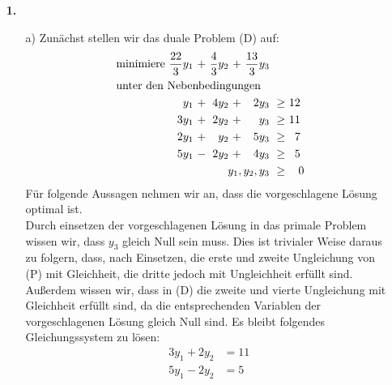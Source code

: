 \documentclass [a4paper,11pt]{article}
\author{\authorinfotitle}
\title{\titleinfo}
\date{\today}
\begin{document}
\maketitle
    \begin{enumerate}
        \item[\textbf{1.}]
            \begin{enumerate}
                \item[a)]
                    Zunächst stellen wir das duale Problem (D) auf:
                    \begin{align*}
                    \begin{alignedat}{6}
                    & \text{minimiere } & \frac{22}{3}y_1 &\ + &\ \frac{4}{3}y_2 &\ + &\ \frac{13}{3}y_3 & & \\
                    & \rlap{unter den Nebenbedingungen} & & & & & & & \\
                    &&  y_1 &\ + &\ 4y_2 &\ + &\ 2y_3 &\ \geq &\ 12\ \\
                    && 3y_1 &\ + &\ 2y_2 &\ + &\  y_3 &\ \geq &\ 11\ \\
                    && 2y_1 &\ + &\  y_2 &\ + &\ 5y_3 &\ \geq &\  7\ \\
                    && 5y_1 &\ - &\ 2y_2 &\ + &\ 4y_3 &\ \geq &\  5\ \\
                    && & & & & \llap{$y_1,y_2,y_3$} &\ \geq &\ 0
                    \end{alignedat}
                    \end{align*}
                    Für folgende Aussagen nehmen wir an, dass die vorgeschlagene Lösung optimal ist.\\
                    Durch einsetzen der vorgeschlagenen Lösung in das primale Problem wissen wir, dass $y_3$ gleich Null sein muss. Dies ist trivialer Weise
                    daraus zu folgern, dass, nach Einsetzen, die erste und zweite Ungleichung von (P) mit Gleichheit, die dritte jedoch mit Ungleichheit erfüllt
                    sind. Außerdem wissen wir, dass in (D) die zweite und vierte Ungleichung mit Gleichheit erfüllt sind, da die entsprechenden Variablen der
                    vorgeschlagenen Lösung gleich Null sind. Es bleibt folgendes Gleichungssystem zu lösen:
                    \begin{align*}
                    3y_1 + 2y_2 &= 11\ \\
                    5y_1 - 2y_2 &= 5\
                    \end{align*}

\end{enumerate}
\end{enumerate}
\end{document}
